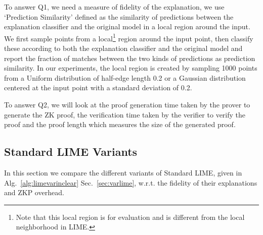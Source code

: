 To answer Q1, we need a measure of fidelity of the explanation, we use `Prediction Similarity' defined as the similarity of predictions between the explanation classifier and the original model in a local region around the input. We first sample points from a local\footnote{Note that this local region is for evaluation and is different from the local neighborhood in LIME.} region around the input point, then classify these according to both the explanation classifier and the original model and report the fraction of matches between the two kinds of predictions as prediction similarity. In our experiments, the local region is created by sampling 1000 points from a Uniform distribution of half-edge length 0.2 or a Gaussian distribution centered at the input point with a standard deviation of 0.2.





To answer Q2, we will look at the proof generation time taken by the prover to generate the ZK proof, the verification time taken by the verifier to verify the proof and the proof length which measures the size of the generated proof.

\subsection{Standard LIME Variants}\label{subsec:expstandardlime}
In this section we compare the different variants of Standard LIME, given in Alg.~\ref{alg:limevarinclear} Sec.~\ref{sec:varlime}, w.r.t. the fidelity of their explanations and ZKP overhead.

